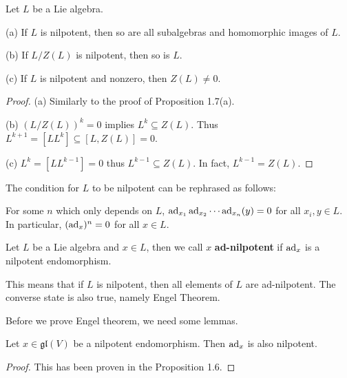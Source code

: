 \begin{proposition}
    Let $L$ be a Lie algebra.

    (a) If $L$ is nilpotent, then so are all subalgebras and homomorphic images of $L$.
    
    (b) If $L/Z(L)$ is nilpotent, then so is $L$. 

    (c) If $L$ is nilpotent and nonzero, then $Z(L)\neq 0$.
\end{proposition}
\begin{proof}
(a) Similarly to the proof of Proposition 1.7(a).

(b) $(L/Z(L))^k=0$ implies $L^k \subseteq Z(L)$. Thus $L^{k+1}=[LL^k]\subseteq [L,Z(L)]=0$.

(c) $L^k=[LL^{k-1}]=0$ thus $L^{k-1} \subseteq Z(L)$. In fact, $L^{k-1}=Z(L)$.
\end{proof}

The condition for $L$ to be nilpotent can be rephrased as follows:
\begin{definition}
    For some $n$ which only depends on $L$, $\operatorname{ad}_{x_{1}}\operatorname{ad}_{x_{2}}\cdots\operatorname{ad}_{x_{n}}(y)=0$ for all $x_{i}, y \in L$. In particular, $(\operatorname{ad}_x)^n=0$ for all $x\in L$.

    Let $L$ be a Lie algebra and $x\in L$, then we call $x$ \textbf{ad-nilpotent} if $\operatorname{ad}_x$ is a nilpotent endomorphism.
\end{definition}
\begin{remark}
    This means that if $L$ is nilpotent, then all elements of $L$ are ad-nilpotent. The converse state is also true, namely Engel Theorem.
\end{remark}

Before we prove Engel theorem, we need some lemmas.
\begin{lemma}
    Let $x \in \mathfrak{gl}(V)$ be a nilpotent endomorphism. Then $\operatorname{ad}_x$ is also nilpotent.
\end{lemma}
\begin{proof}
    This has been proven in the Proposition 1.6.
\end{proof}

